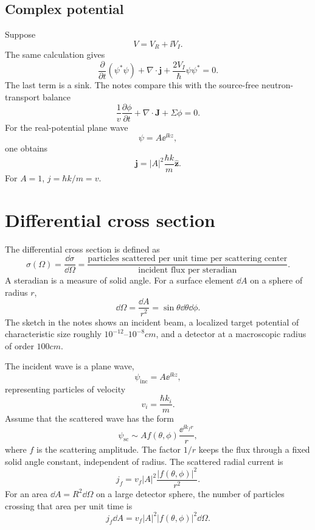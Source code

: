 \subsection*{Complex potential}
Suppose
\[
  V=V_R+\ii V_I.
\]
The same calculation gives
\begin{equation}
  \frac{\partial}{\partial t}(\psi^*\psi)
  +\nabla\cdot\bm j
  +\frac{2V_I}{\hbar}\psi\psi^*=0.
  \label{eq:qs-complex-continuity}
\end{equation}
The last term is a sink.  The notes compare this with the source-free neutron-transport balance
\[
  \frac{1}{v}\frac{\partial\phi}{\partial t}
  +\nabla\cdot\bm J+\Sigma\phi=0.
\]
For the real-potential plane wave
\[
  \psi=A\ee^{\ii kz},
\]
one obtains
\[
  \bm j=|A|^2\frac{\hbar k}{m}\hat{\bm z}.
\]
For $A=1$, $j=\hbar k/m=v$.

\section{Differential cross section}
The differential cross section is defined as
\[
  \sigma(\Omega)=\frac{\dd\sigma}{\dd\Omega}
  =\frac{\text{particles scattered per unit time per scattering center}}
  {\text{incident flux per steradian}}.
\]
A steradian is a measure of solid angle.  For a surface element $\dd A$ on a sphere of radius $r$,
\[
  \dd\Omega=\frac{\dd A}{r^2}=\sin\theta\dd\theta\dd\phi.
\]
The sketch in the notes shows an incident beam, a localized target potential of characteristic size roughly $10^{-12}$--$10^{-8}\unit{cm}$, and a detector at a macroscopic radius of order $100\unit{cm}$.

The incident wave is a plane wave,
\begin{equation}
  \psi_{\mathrm{inc}}=A\ee^{\ii kz},
  \label{eq:qs-inc-wave}
\end{equation}
representing particles of velocity
\[
  v_i=\frac{\hbar k_i}{m}.
\]
Assume that the scattered wave has the form
\begin{equation}
  \psi_{\mathrm{sc}}
  \sim A f(\theta,\phi)\frac{\ee^{\ii k_fr}}{r},
  \label{eq:qs-sc-wave}
\end{equation}
where $f$ is the scattering amplitude.  The factor $1/r$ keeps the flux through a fixed solid angle constant, independent of radius.  The scattered radial current is
\[
  j_f=v_f|A|^2\frac{|f(\theta,\phi)|^2}{r^2}.
\]
For an area $\dd A=R^2\dd\Omega$ on a large detector sphere, the number of particles crossing that area per unit time is
\[
  j_f\dd A=v_f|A|^2|f(\theta,\phi)|^2\dd\Omega.
\]

